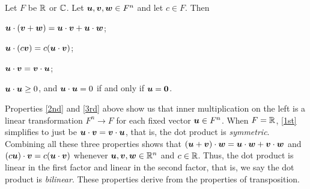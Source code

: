 \begin{Thm}\label{thm:inner} Let $F$ be $\mathbb{R}$ or $\mathbb{C}$. Let $\boldsymbol u, \boldsymbol v, \boldsymbol w\in F^n$ and let $c\in F$. Then

\begin{enumerate}[!THM!,start=1]
\begin{multicols}{2}
\item\label{2nd} $\boldsymbol u \cdot(\boldsymbol v + \boldsymbol w) = \boldsymbol u \cdot \boldsymbol v  + \boldsymbol u \cdot \boldsymbol w$;
\item\label{3rd} $\boldsymbol u\cdot (c\boldsymbol v) = c(\boldsymbol u\cdot \boldsymbol v)$;
\end{multicols}
\begin{multicols}{2}
\item\label{1st} $\boldsymbol u \cdot \boldsymbol v = \boldsymbol v \cdot \boldsymbol u$;
\item\label{4th} $\boldsymbol u \cdot \boldsymbol u \ge 0$, and $\boldsymbol u \cdot \boldsymbol u = 0$ if and only if $\boldsymbol u = \boldsymbol 0$.
\end{multicols}
\end{enumerate}
\end{Thm}
%
Properties \ref{2nd} and \ref{3rd} above show us that inner multiplication on the left is a linear transformation $F^n\to F$ for each fixed vector $\boldsymbol u\in F^n$. When $F=\mathbb{R}$, \ref{1st} simplifies to just be $\boldsymbol u\cdot \boldsymbol v=\boldsymbol v\cdot \boldsymbol u$, that is, the dot product is \emph{symmetric}. Combining all these three properties shows that $(\boldsymbol u+\boldsymbol v)\cdot \boldsymbol w = \boldsymbol u\cdot \boldsymbol w + \boldsymbol v\cdot \boldsymbol w$ and $(c\boldsymbol u)\cdot \boldsymbol v = c(\boldsymbol u\cdot \boldsymbol v)$ whenever $\boldsymbol u, \boldsymbol v, \boldsymbol w\in \mathbb{R}^n$ and $c\in \mathbb{R}$. Thus, the dot product is linear in the first factor and linear in the second factor, that is, we say the dot product is \emph{bilinear}. These properties derive from the properties of transposition.\\

